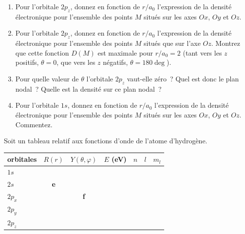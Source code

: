 \begin{enumerate}

\item Pour l'orbitale $2p_z$, donnez en fonction de $r/a_0$ l'expression de la 
densit\'e \'electronique pour l'ensemble des points $M$ situ\'es sur les axes $Ox$, $Oy$ et $Oz$.

\item Pour l'orbitale $2p_z$, donnez en fonction de $r/a_0$ l'expression de la 
densit\'e \'electronique pour l'ensemble des points $M$ situ\'es que sur l'axe $Oz$. 
Montrez que cette fonction $D(M)$ est maximale pour $r/a_0=2$ 
(tant vers les $z$ positifs, $\theta=0$, que vers les $z$ n\'egatifs, $\theta=180\deg$).

\item Pour quelle valeur de $\theta$ l'orbitale $2p_z$ vaut-elle z\'ero~? Quel est donc le plan nodal~?
Quelle est la densit\'e sur ce plan nodal~?

\item Pour l'orbitale $1s$, donnez en fonction de $r/a_0$ l'expression de la densit\'e 
\'electronique pour l'ensemble des points $M$ situ\'es sur les axes $Ox$, $Oy$ et $Oz$. 
Commentez.
\end{enumerate}

%

Soit un tableau relatif aux fonctions d'onde de l'atome d'hydrog\`ene.

\begin{center}
\begin{tabular}{|l|c|c|c|c|c| c|}\hline
orbitales & $R(r)$ & $Y(\theta,\varphi)$ & $E$ (eV) & $n$ & $l$ &  $m_l$\\\hline
$1s$   &           &                     & & & &\\\hline
$2s$   & \textbf{e}&                     & & & &\\\hline
$2p_x$ &           & \textbf{f}          & & & &\cellcolor{gray} \\\hline
$2p_y$ &           &                     & & & &\cellcolor{gray}\\\hline
$2p_z$ &           &                     & & & &\\\hline
\end{tabular}
\end{center}

